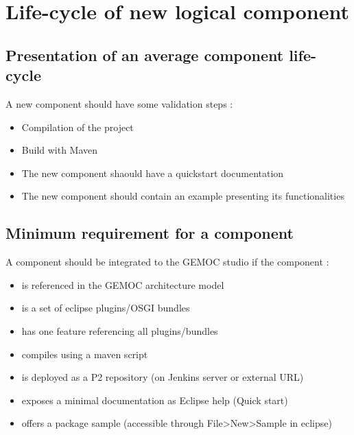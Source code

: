 \documentclass{gemoc} %
\begin{document}
\section{Life-cycle of new logical component}
\subsection{Presentation of an average component life-cycle}
A new component should have some validation steps :
\begin{itemize}
	\item Compilation of the project
	\item Build with Maven
	\item The new component shaould have a quickstart documentation
	\item The new component should contain an example presenting its functionalities
\end{itemize}
\subsection{Minimum requirement for a component}
A component should be integrated to the GEMOC studio if the component : 
\newline
\begin{itemize}
	\item is referenced in the GEMOC architecture model
	\item is a set of eclipse plugins/OSGI bundles
	\item has one feature referencing all plugins/bundles
	\item compiles using a maven script
	\item is deployed as a P2 repository (on Jenkins server or external URL)
	\item exposes a minimal documentation as Eclipse help (Quick start)
	\item offers a package sample (accessible through File>New>Sample in eclipse)
\end{itemize}

\end{document}
